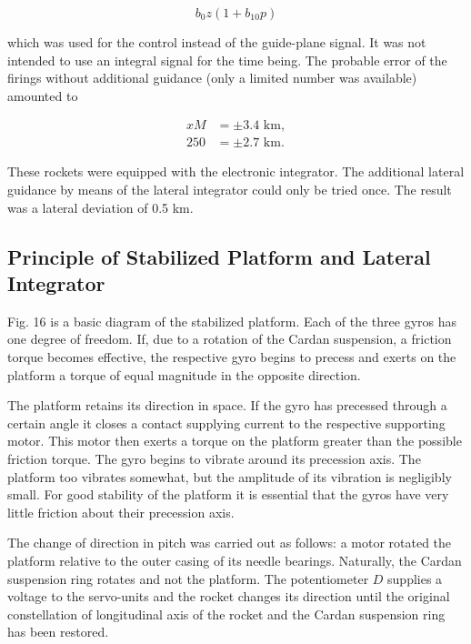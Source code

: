 \documentclass[12pt, a4paper]{article}
\begin{document}
\begin{equation}
  b_{0}z(1+b_{10}p)
\end{equation}

which was used for the control instead of the guide-plane signal. It was not intended to use an integral signal for the time being. The probable error of the firings without additional guidance (only a limited number was available) amounted to

\begin{equation*}
  \begin{split}
    x M&=\pm3.4\text{ km},\\
    250&=\pm2.7\text{ km}.
  \end{split}
\end{equation*}

These rockets were equipped with the electronic integrator. The additional lateral guidance by means of the lateral integrator could only be tried once. The result was a lateral deviation of 0.5 km.

\subsection{Principle of Stabilized Platform and Lateral Integrator}

Fig. 16 is a basic diagram of the stabilized platform. Each of the three gyros has one degree of freedom. If, due to a rotation of the Cardan suspension, a friction torque becomes effective, the respective gyro begins to precess and exerts on the platform a torque of equal magnitude in the opposite direction.

The platform retains its direction in space. If the gyro has precessed through a certain angle it closes a contact supplying current to the respective supporting motor. This motor then exerts a torque on the platform greater than the possible friction torque. The gyro begins to vibrate around its precession axis. The platform too vibrates somewhat, but the amplitude of its vibration is negligibly small. For good stability of the platform it is essential that the gyros have very little friction about their precession axis.

The change of direction in pitch was carried out as follows: a motor rotated the platform relative to the outer casing of its needle bearings. Naturally, the Cardan suspension ring rotates and not the platform. The potentiometer $D$ supplies a voltage to the servo-units and the rocket changes its direction until the original constellation of longitudinal axis of the rocket and the Cardan suspension ring has been restored.
\end{document}
